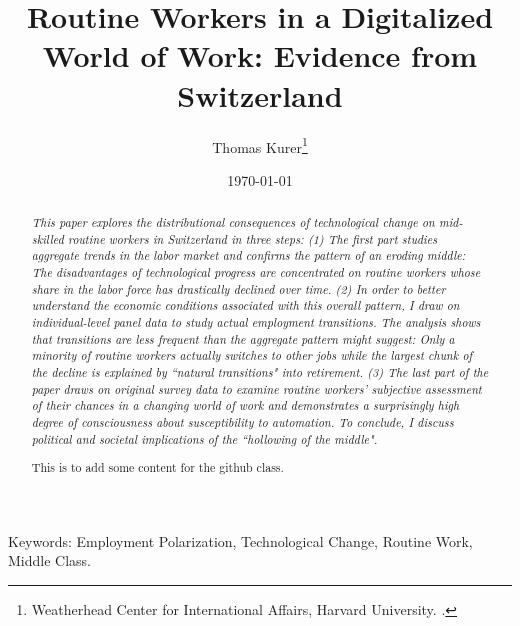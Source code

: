 \documentclass[smallheadings,12pt,a4paper, bibtotoc, abstracton, pointlessnumbers]{scrartcl}
\begin{document}
	
	
	\title{\Large{Routine Workers in a Digitalized World of Work: Evidence from Switzerland}}
	
	\author{\large
		Thomas Kurer\thanks{Weatherhead Center for International Affairs, Harvard University. .}
	}
	
	\date{\small{\today} \\ %
	}
	\maketitle
	\begin{abstract}
		\noindent
		{\em
This paper explores the distributional consequences of technological change on mid-skilled routine workers in Switzerland in three steps: (1) The first part studies aggregate trends in the labor market and confirms the pattern of an eroding middle: The disadvantages of technological progress are concentrated on routine workers whose share in the labor force has drastically declined over time. (2) In order to better understand the economic conditions associated with this overall pattern, I draw on individual-level panel data to study actual employment transitions. The analysis shows that transitions are less frequent than the aggregate pattern might suggest: Only a minority of routine workers actually switches to other jobs while the largest chunk of the decline is explained by ``natural transitions" into retirement. (3) The last part of the paper draws on original survey data to examine routine workers' subjective assessment of their chances in a changing world of work and demonstrates a surprisingly high degree of consciousness about susceptibility to automation. To conclude, I discuss political and societal implications of the ``hollowing of the middle".

This is to add some content for the github class.
		}

	\end{abstract}
\vspace{1cm}
Keywords: Employment Polarization, Technological Change, Routine Work, Middle Class.
	
	\thispagestyle{empty}
\end{document}
